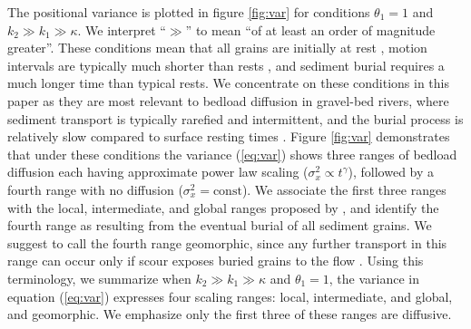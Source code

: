 \documentclass[draft,grl]{agujournal2018}
\begin{document}
The positional variance is plotted in figure \ref{fig:var} for conditions $\theta_1=1$ and $k_2\gg k_1 \gg \kappa$.
We interpret ``$\gg$'' to mean ``of at least an order of magnitude greater''.
These conditions mean that all grains are initially at rest \citep[cf.,][]{Wu2019}, motion intervals are typically much shorter than rests \citep[cf.,][]{Einstein1937}, and sediment burial requires a much longer time than typical rests.
We concentrate on these conditions in this paper as they are most relevant to bedload diffusion in gravel-bed rivers, where sediment transport is typically rarefied and intermittent, and the burial process is relatively slow compared to surface resting times \citep[e.g.,][]{Ferguson2002,Hassan1994}.
Figure \ref{fig:var} demonstrates that under these conditions the variance (\ref{eq:var}) shows three ranges of bedload diffusion each having approximate power law scaling ($\sigma_x^2 \propto t^\gamma$), followed by a fourth range with no diffusion ($\sigma_x^2 = \text{const}$). We associate the first three ranges with the local, intermediate, and global ranges proposed by \citet{Nikora2001a,Nikora2002}, and identify the fourth range as resulting from the eventual burial of all sediment grains.
We suggest to call the fourth range geomorphic, since any further transport in this range can occur only if scour exposes buried grains to the flow \citep[cf.,][]{Nakagawa1980,Voepel2013,Martin2014}.
Using this terminology, we summarize when $k_2\gg k_1 \gg \kappa$ and $\theta_1=1$, the variance in equation (\ref{eq:var}) expresses four scaling ranges: local, intermediate, and global, and geomorphic.
We emphasize only the first three of these ranges are diffusive.
\end{document}
